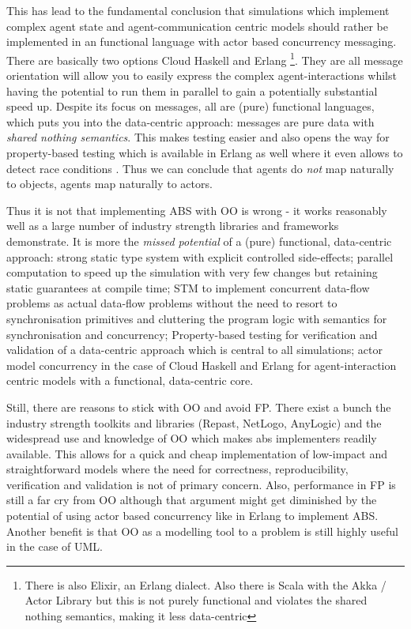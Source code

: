 This has lead to the fundamental conclusion that simulations which implement complex agent state and agent-communication centric models should rather be implemented in an functional language with actor based concurrency messaging. There are basically two options Cloud Haskell and Erlang \footnote{There is also Elixir, an Erlang dialect. Also there is Scala with the Akka / Actor Library but this is not purely functional and violates the shared nothing semantics, making it less data-centric}.
They are all message orientation will allow you to easily express the complex agent-interactions whilst having the potential to run them in parallel to gain a potentially substantial speed up. Despite its focus on messages, all are (pure) functional languages, which puts you into the data-centric approach: messages are pure data with \textit{shared nothing semantics}. This makes testing easier and also opens the way for property-based testing which is available in Erlang as well where it even allows to detect race conditions \cite{claessen_finding_2009}. Thus we can conclude that agents do \textit{not} map naturally to objects, agents map naturally to actors. 


\medskip

Thus it is not that implementing ABS with OO is wrong - it works reasonably well as a large number of industry strength libraries and frameworks demonstrate. It is more the \textit{missed potential} of a (pure) functional, data-centric approach: strong static type system with explicit controlled side-effects; parallel computation to speed up the simulation with very few changes but retaining static guarantees at compile time; STM to implement concurrent data-flow problems as actual data-flow problems without the need to resort to synchronisation primitives and cluttering the program logic with semantics for synchronisation and concurrency; Property-based testing for verification and validation of a data-centric approach which is central to all simulations; actor model concurrency in the case of Cloud Haskell and Erlang for agent-interaction centric models with a functional, data-centric core. 

Still, there are reasons to stick with OO and avoid FP. There exist a bunch the industry strength toolkits and libraries (Repast, NetLogo, AnyLogic) and the widespread use and knowledge of OO which makes abs implementers readily available. This allows for a quick and cheap implementation of low-impact and straightforward models where the need for correctness, reproducibility, verification and validation is not of primary concern. Also, performance in FP is still a far cry from OO although that argument might get diminished by the potential of using actor based concurrency like in Erlang to implement ABS. Another benefit is that OO as a modelling tool to a problem is still highly useful in the case of UML.

